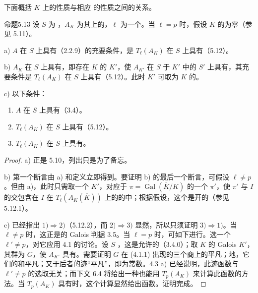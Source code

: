 下面概括 $K$ 上的性质与相应 的性质之间的关系。
\begin{SGAresult}{命题}{5.13}
设 $S$ 为  ，$A_K$ 为其上的，$\ell$ 为一个。当 $\ell=p$ 时，假设 $K$ 的为零（参见 5.11）。

 a) $A$ 在 $S$ 上具有（2.2.9）的充要条件，是 $T_\ell(A_K)$ 在 $S$ 上具有（5.12）。

 b) $A_K$ 在 $S$ 上具有，即存在 $K$ 的 $K'$，使 $A_{K'}$ 在 $S$ 于 $K'$ 中的 $S'$ 上具有，其充要条件是 $T_\ell(A_K)$ 在 $S$ 上具有（5.12）。此时 $K'$ 可取为 $K$ 的。

 c) 以下条件：
\begin{enumerate}
\item $A$ 在 $S$ 上具有（3.4）。
\item $T_\ell(A_K)$ 在 $S$ 上具有（5.12）。
\item $T_\ell(A_K)$ 在 $S$ 上具有。
\end{enumerate}
\end{SGAresult}
\begin{proof}
a) 正是 5.10，列出只是为了备忘。

b) 第一个断言由 a) 和定义立即得到。要证明 b) 的最后一个断言，可假设 $\ell\ne p$。但由 a)，此时只需取一个
$K'$，对应于 $\pi=\operatorname{Gal}(\overline K/K)$ 的一个 $\pi'$，使 $\pi'$ 与 $I$ 的交包含在 $I$ 在 $T_\ell(A_K(\overline K))$ 上的的中；根据假设，这个是开的（参见 5.12.1）。

c) 已经指出 $1)\Rightarrow2)$（5.12.2），而 $2)\Rightarrow3)$ 显然，所以只须证明 $3)\Rightarrow1)$。当 $\ell\ne p$ 时，这正是的 Galois 判据 3.5。当 $\ell=p$ 时，可如下进行。选一个 $\ell'\ne p$，对它应用 4.1 的讨论。设 $S$ ，这是允许的（3.4.0）；取 $K$ 的 Galois  $K'$，其群为 $G$，使 $A_{K'}$ 具有。需要证明 $G$ 在 (4.1.1) 出现的三个商上的平凡；地，它们的和平凡；又于后者的迹“平凡”，即为常数。4.3 a) 已经说明，此迹函数与 $\ell'\ne p$ 的选取无关；而下文 6.4 将给出一种也能用 $T_p(A_K)$ 来计算此函数的方法。当 $T_p(A_K)$ 具有时，这个计算显然给出函数。证明完成。
\end{proof}

